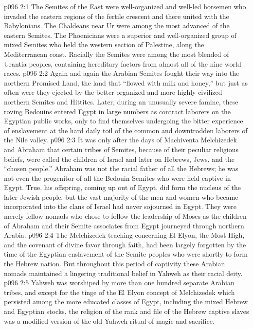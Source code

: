 \vs p096 2:1 The Semites of the East were well\hyp{}organized and well\hyp{}led horsemen who invaded the eastern regions of the fertile crescent and there united with the Babylonians. The Chaldeans near Ur were among the most advanced of the eastern Semites. The Phoenicians were a superior and well\hyp{}organized group of mixed Semites who held the western section of Palestine, along the Mediterranean coast. Racially the Semites were among the most blended of Urantia peoples, containing hereditary factors from almost all of the nine world races.
\vs p096 2:2 Again and again the Arabian Semites fought their way into the northern Promised Land, the land that “flowed with milk and honey,” but just as often were they ejected by the better\hyp{}organized and more highly civilized northern Semites and Hittites. Later, during an unusually severe famine, these roving Bedouins entered Egypt in large numbers as contract laborers on the Egyptian public works, only to find themselves undergoing the bitter experience of enslavement at the hard daily toil of the common and downtrodden laborers of the Nile valley.
\vs p096 2:3 It was only after the days of Machiventa Melchizedek and Abraham that certain tribes of Semites, because of their peculiar religious beliefs, were called the children of Israel and later on Hebrews, Jews, and the “chosen people.” Abraham was not the racial father of all the Hebrews; he was not even the progenitor of all the Bedouin Semites who were held captive in Egypt. True, his offspring, coming up out of Egypt, did form the nucleus of the later Jewish people, but the vast majority of the men and women who became incorporated into the clans of Israel had never sojourned in Egypt. They were merely fellow nomads who chose to follow the leadership of Moses as the children of Abraham and their Semite associates from Egypt journeyed through northern Arabia.
\vs p096 2:4 \pc The Melchizedek teaching concerning El Elyon, the Most High, and the covenant of divine favor through faith, had been largely forgotten by the time of the Egyptian enslavement of the Semite peoples who were shortly to form the Hebrew nation. But throughout this period of captivity these Arabian nomads maintained a lingering traditional belief in Yahweh as their racial deity.
\vs p096 2:5 Yahweh was worshiped by more than one hundred separate Arabian tribes, and except for the tinge of the El Elyon concept of Melchizedek which persisted among the more educated classes of Egypt, including the mixed Hebrew and Egyptian stocks, the religion of the rank and file of the Hebrew captive slaves was a modified version of the old Yahweh ritual of magic and sacrifice.
